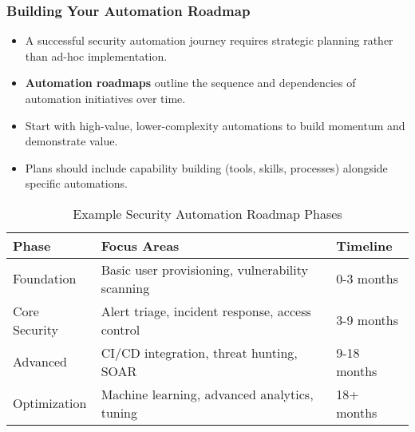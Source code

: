 \documentclass{beamer}
\begin{document}
\begin{frame}
  \frametitle{Building Your Automation Roadmap}
  
  \begin{itemize}
    \item A successful security automation journey requires strategic planning rather than ad-hoc implementation.
    \item \textbf{Automation roadmaps} outline the sequence and dependencies of automation initiatives over time.
    \item Start with high-value, lower-complexity automations to build momentum and demonstrate value.
    \item Plans should include capability building (tools, skills, processes) alongside specific automations.
  \end{itemize}
  
  \begin{table}
    \scriptsize
    \begin{tabular}{|l|l|l|}
      \hline
      \textbf{Phase} & \textbf{Focus Areas} & \textbf{Timeline} \\
      \hline
      Foundation & Basic user provisioning, vulnerability scanning & 0-3 months \\
      \hline
      Core Security & Alert triage, incident response, access control & 3-9 months \\
      \hline
      Advanced & CI/CD integration, threat hunting, SOAR & 9-18 months \\
      \hline
      Optimization & Machine learning, advanced analytics, tuning & 18+ months \\
      \hline
    \end{tabular}
    \caption{Example Security Automation Roadmap Phases}
  \end{table}
\end{frame}
\end{document}
